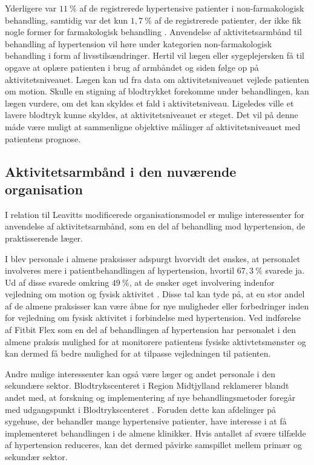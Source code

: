 Yderligere var $11~\%$ af de registrerede hypertensive patienter i non-farmakologisk behandling, samtidig var det kun $1,7~\%$ af de registrerede patienter, der ikke fik nogle former for farmakologisk behandling \citep{munck2007}.
Anvendelse af aktivitetsarmbånd til behandling af hypertension vil høre under kategorien non-farmakologisk behandling i form af livsstilsændringer. Hertil vil lægen eller sygeplejersken få til opgave at oplære patienten i brug af armbåndet og siden følge op på aktivitetsniveauet. Lægen kan ud fra data om aktivitetsniveauet vejlede patienten om motion. 
Skulle en stigning af blodtrykket forekomme under behandlingen, kan lægen vurdere, om det kan skyldes et fald i aktivitetsniveau. Ligeledes ville et lavere blodtryk kunne skyldes, at aktivitetsniveauet er steget. Det vil på denne måde være muligt at sammenligne objektive målinger af aktivitetsniveauet med patientens prognose. 

\subsection{Aktivitetsarmbånd i den nuværende organisation}
I relation til Leavitts modificerede organisationsmodel er mulige interessenter for anvendelse af aktivitetsarmbånd, som en del af behandling mod hypertension, de praktisserende læger.

I  blev personale i almene praksisser adspurgt hvorvidt det ønskes, at personalet involveres mere i patientbehandlingen af hypertension, hvortil $67,3~\%$ svarede ja. Ud af disse svarede omkring $49~\%$, at de ønsker øget involvering indenfor vejledning om motion og fysisk aktivitet \citep{munck2007}. Disse tal kan tyde på, at en stor andel af de almene praksisser kan være åbne for nye muligheder eller forbedringer inden for vejledning om fysisk aktivitet i forbindelse med hypertension. Ved indførelse af Fitbit Flex som en del af behandlingen af hypertension har personalet i den almene praksis mulighed for at monitorere patientens fysiske aktivtetsmønster og kan dermed få bedre mulighed for at tilpasse vejledningen til patienten. 

Andre mulige interessenter kan også være læger og andet personale i den sekundære sektor. Blodtrykscenteret i Region Midtjylland reklamerer blandt andet med, at forskning og implementering af nye behandlingsmetoder foregår med udgangspunkt i Blodtrykscenteret \citep{aarhusuniversitetshospital}. Foruden dette kan afdelinger på sygehuse, der behandler mange hypertensive patienter, have interesse i at få implementeret behandlingen i de almene klinikker. Hvis antallet af svære tilfælde af hypertension reduceres, kan det dermed påvirke samspillet mellem primær og sekundær sektor. 